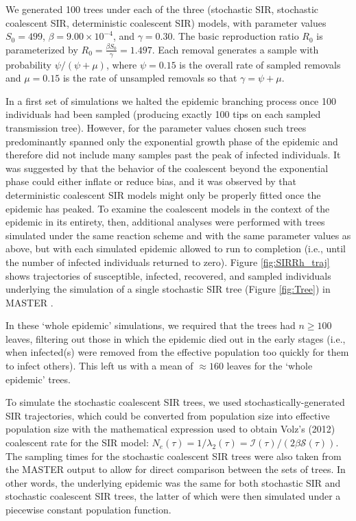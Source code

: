 \documentclass[12pt,titlepage]{article}
\newcommand{\St}{\mathcal{S}}
\newcommand{\It}{\mathcal{I}}
\newcommand{\stochCoalSIR}{stochastic coalescent SIR}
\newcommand{\deterCoalSIR}{deterministic coalescent SIR}
\newcommand{\stochSIR}{stochastic SIR}
\begin{document}
We generated 100 trees under each of the three (\stochSIR{}, \stochCoalSIR{}, \deterCoalSIR{}) models,
with parameter values $S_{0}=499$, $\beta= 9.00\times 10^{-4}$, and $\gamma=0.30$.  The basic reproduction ratio ${R_0}$ is parameterized by ${R_0} = \frac{\beta S_{0}}{\gamma} = 1.497$.  Each removal generates a sample with probability $\psi/(\psi+\mu)$, where $\psi=0.15$ is the overall rate of sampled removals and $\mu=0.15$ is the rate of unsampled removals so that $\gamma = \psi + \mu$. 

In a first set of simulations we halted the epidemic branching process once 100 individuals had been sampled (producing exactly 100 tips on each sampled transmission tree). However, for the parameter values chosen such trees predominantly spanned only the exponential growth phase of the epidemic and therefore did not include many samples past the peak of infected individuals.  It was suggested by \cite{Stadler:2014} that the behavior of the 
coalescent beyond the exponential phase could either inflate or reduce bias, and it was observed by \cite{DearloveandWilson} that deterministic coalescent SIR models might only be properly fitted once the epidemic has peaked.  To examine the coalescent models in the context of the epidemic in its entirety, then, additional analyses were performed with trees simulated under the same reaction scheme and with the same parameter values as above, but with each simulated epidemic allowed to run to completion (i.e., until the number of infected individuals returned to zero). Figure \ref{fig:SIRRh_traj} shows trajectories of susceptible, infected, recovered, and sampled individuals underlying the simulation of a single stochastic SIR tree (Figure \ref{fig:Tree}) in MASTER \citep{Vaughan:MASTER}.

In these `whole epidemic' simulations, we required that the trees had $n\geq 100$ leaves, filtering out those in which the epidemic died out in the early stages (i.e., when infected(s) were removed from the effective population too quickly for them to infect others).  This left us with a mean of $\approx 160$ leaves for the `whole epidemic' trees.

To simulate the \stochCoalSIR{} trees, we used stochastically-generated SIR 
trajectories, which could be converted from population size into effective population size 
with the mathematical expression used to obtain Volz's (2012) coalescent rate for the SIR 
model:  $N_e(\tau) = 1/ \lambda_2(\tau) = \It(\tau)/(2{\beta}\St(\tau))$. %
  The sampling times for the \stochCoalSIR{} trees were also 
taken from the MASTER output to allow for direct comparison between the sets of trees.  
In other words, the underlying epidemic was the same for both \stochSIR{} and 
\stochCoalSIR{} trees, the latter of which were then simulated under a piecewise constant population function.
\end{document}
